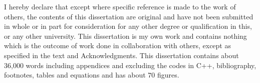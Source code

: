
\begin{declaration}

I hereby declare that except where specific reference is made to the work of 
others, the contents of this dissertation are original and have not been 
submitted in whole or in part for consideration for any other degree or 
qualification in this, or any other university. This dissertation is my own 
work and contains nothing which is the outcome of work done in collaboration 
with others, except as specified in the text and Acknowledgments. This 
dissertation contains about 36,000 words including appendices and excluding the codes in C++, 
bibliography, footnotes, tables and equations and has about $70$ figures.


\end{declaration}